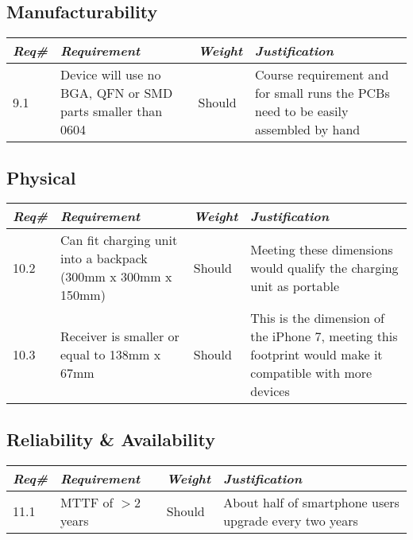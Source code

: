     \subsection{Manufacturability}
        \begin{centering}
        \begin{tabular}{|l|m{7cm}|l|m{7cm}|} \hline
        \textit{\textbf{Req\#}}	& \textit{\textbf{Requirement}} &\textit{\textbf{Weight}}&\textit{\textbf{Justification}} \\ \hline
        9.1 & Device will use no BGA, QFN or SMD parts smaller than 0604 & Should & Course requirement and for small runs the PCBs need to be easily assembled by hand \\ \hline    
        \end{tabular}
        \end{centering}

    \subsection{Physical}
        \begin{centering}
        \begin{tabular}{|l|m{7cm}|l|m{7cm}|} \hline
        \textit{\textbf{Req\#}}	& \textit{\textbf{Requirement}} &\textit{\textbf{Weight}}&\textit{\textbf{Justification}} \\ \hline
        10.2 & Can fit charging unit into a backpack (300mm x 300mm x 150mm)	& Should & Meeting these dimensions would qualify the charging unit as portable \\ \hline
        10.3 & Receiver is smaller or equal to 138mm x 67mm	& Should & This is the dimension of the iPhone 7, meeting this footprint would make it compatible with more devices \\ \hline    
        \end{tabular}
        \end{centering}
        
        \subsection{Reliability \& Availability}
        \begin{centering}
        \begin{tabular}{|l|m{7cm}|l|m{7cm}|} \hline
        \textit{\textbf{Req\#}}	& \textit{\textbf{Requirement}} &\textit{\textbf{Weight}}&\textit{\textbf{Justification}} \\ \hline
        11.1 & MTTF of $>2$ years & Should & About half of smartphone users upgrade every two years \cite{forbes} \\ \hline
        \end{tabular}
        \end{centering}
 

